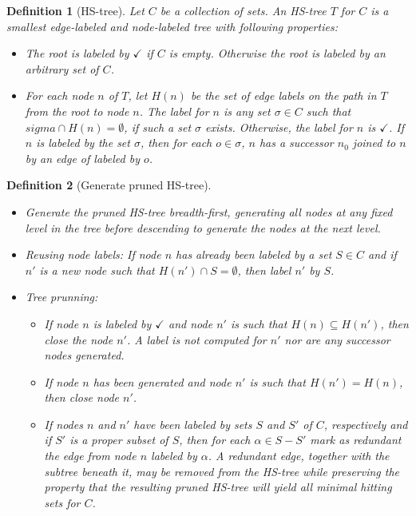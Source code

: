 \documentclass[12pt,a4paper]{article}
\newtheorem{definition}{Definition}[subsection]
\begin{document}
\begin{definition}[HS-tree]
	Let $C$ be a collection of sets. An HS-tree $T$ for $C$ is a smallest edge-labeled and node-labeled tree with following properties:
	
	\begin{itemize}
		\item The root is labeled by $\checkmark$ if $C$ is empty. Otherwise the root is labeled by an arbitrary set of $C$.
		
		\item For each node $n$ of $T$, let $H(n)$ be the set of edge labels on the path in $T$ from the root to node $n$. The label for $n$ is any set $\sigma \in C$ such that $sigma \cap H(n) = \emptyset$, if such a set $\sigma$ exists. Otherwise, the label for $n$ is $\checkmark$. If $n$ is labeled by the set $\sigma$, then for each $o \in \sigma$, $n$ has a successor $n_{0}$ joined to $n$ by an edge of labeled by $o$.
	\end{itemize}
	
\end{definition}

\begin{definition}[Generate pruned HS-tree]{\indent}
	\begin{itemize}
		\item Generate the pruned HS-tree breadth-first, generating all nodes at any fixed level in the tree before descending to generate the nodes at the next level.
		
		\item Reusing node labels: If node $n$ has already been labeled by a set $S \in C$ and if $n'$ is a new node such that $H(n') \cap S = \emptyset$, then label $n'$ by $S$.
		
		\item Tree prunning:
		
		\begin{itemize}
			\item If node $n$ is labeled by $\checkmark$ and node $n'$ is such that $H(n) \subseteq H(n')$, then close the node $n'$. A label is not computed for $n'$ nor are any successor nodes generated.
			
			\item If node $n$ has been generated and node $n'$ is such that $H(n') = H(n)$, then close node $n'$.
			
			\item If nodes $n$ and $n'$ have been labeled by sets $S$ and $S'$ of $C$, respectively and if $S'$ is a proper subset of $S$, then for each $\alpha \in S - S'$ mark as redundant the edge from node $n$ labeled by $\alpha$. A redundant edge, together with the subtree beneath it, may be removed from the HS-tree while preserving the property that the resulting pruned HS-tree will yield all minimal hitting sets for $C$.
			
		\end{itemize}	
		
	\end{itemize}
	
\end{definition}
\end{document}
